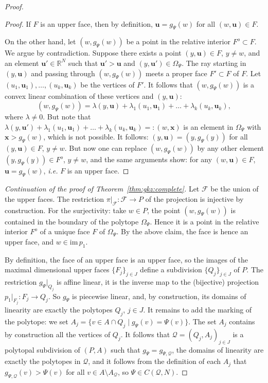 \documentclass[12pt, a4article]{amsart}   	%
\numberwithin{equation}{section}
\theoremstyle{plain}
\theoremstyle{definition}
\begin{document}
\begin{proof}
\begin{proof}
If $F$ is an upper face, then by definition, $\mathbf u=g_{\Psi}(w)$ for all $( w,\mathbf u)\in F$. 

On the other hand, let $(  w,g_{\Psi}(  w))$ be a point in the relative interior $F^o\subset F$. We argue by contradiction. Suppose there exists a point $( y, \mathbf u)\in F$, $ y\not= w$, and an element 
$\mathbf u'\in \mathbb R^N$ such that $\mathbf u'>\mathbf u$ and $(  y, \mathbf u')\in \Omega_\Psi$. 
The ray starting in $(  y,\mathbf u)$ and passing through $(  w,g_{\Psi}( w))$ 
meets a proper face $F'\subset F$ of $F$. 
Let $( u_1,\mathbf u_1),\ldots,(  u_k,\mathbf u_k)$ be the vertices of $F'$. It follows that 
$(  w,g_{\Psi}(  w))$ is a convex linear combination of these vertices and $(  y,\mathbf u)$:
\[
(  w,g_{\Psi}(  w))= \lambda (  y,\mathbf u)+\lambda_1(  u_1,\mathbf u_1)+\ldots +\lambda_k(  u_k,\mathbf u_k),
\]
where $\lambda\not=0$. But note that $\lambda (  y,\mathbf u')+\lambda_1( u_1,\mathbf u_1)+\ldots +\lambda_k(  u_k,\mathbf u_k)=:(  w,\mathbf x)$ 
is an element in $\Omega_\Psi$ with $\mathbf x>g_{\Psi}(  w)$, which is not possible. It follows: $(  y,\mathbf u)
=(  y,g_{\Psi}(  y))$ for all $(  y,\mathbf u)\in F$, $  y\not=  w$. But now one can replace $(  w,g_{\Psi}(  w))$ 
by any other element $(  y,g_{\Psi}(  y))\in F^o$, $  y\not=  w$, and the same arguments show: for any
$(  w,\mathbf u)\in F$, $\mathbf u=g_{\Psi}(  w)$, \emph{i.e.} $F$ is an upper face.
\end{proof}

\par
\noindent
\textit{Continuation of the proof of Theorem~\ref{thm:gkz:complete}.}
Let $\mathcal F$ be the union of the upper faces. The restriction $\pi\vert_{\mathcal F}:\mathcal F\rightarrow P$ of the projection is injective by construction. For the surjectivity: take $w\in P$, the point $(w,g_{\Psi}( w))$ is contained in the boundary of the polytope $\Omega_\Psi$. Hence it is a point in the relative interior $F^o$ of a unique face $F$ of $\Omega_\Psi$. By the above claim, the face is hence an upper face, and 
$  w\in \mathrm{im\,}p_1$.

By definition, the face of an upper face is an upper face, so the images of the maximal dimensional 
upper faces $\{F_j\}_{j\in J}$ define a subdivision $\{Q_j\}_{j\in J}$ of $P$.
The restriction $g_\Psi\vert_{Q_j}$ is affine linear, it is the inverse map to the (bijective) projection 
$p_1\vert_{F_j}: F_j\rightarrow Q_j$. So $g_{\Psi}$ is piecewise linear, and, by construction, its domains of linearity are 
exactly the polytopes $Q_j$, $j\in J$. It remains to add the marking of the polytope: we set 
$A_j=\{  v\in A\cap Q_j\mid  g_\Psi( v)=\Psi({v})\}$. The set $A_j$ contains by construction all the vertices of $Q_j$. 
It follows that $\mathcal Q=(Q_j,A_j)_{j\in J}$ is a polytopal subdivision of $(P, A)$ such that $g_{\Psi}=g_{\Psi,\mathcal Q}$, 
the domains of linearity are exactly the polytopes in $\mathcal Q$, and it follows from the definition of each $A_j$ that $g_{\Psi,\mathcal Q}(v)>\Psi(v)$ 
for all $v\in A\setminus A_{\mathcal Q}$, so $\Psi\in C(\mathcal Q, N)$.
\end{proof}
\end{document}
